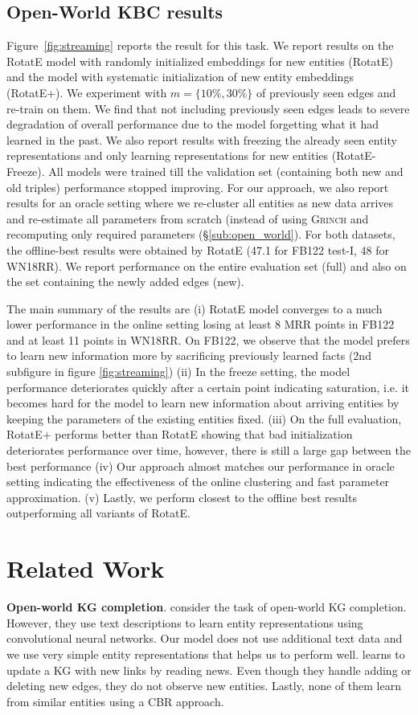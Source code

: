 \documentclass[11pt,a4paper]{article}
\newcommand{\fb}{FB122\xspace}
\newcommand{\wn}{WN18RR\xspace}
\newcommand{\grinch}{\textsc{Grinch}\xspace}
\begin{document}
\subsection{Open-World KBC results}
\label{sub:online}
Figure~\ref{fig:streaming} reports the result for this task. We report results on the RotatE model with randomly initialized embeddings for new entities (RotatE) and the model with systematic initialization of new entity embeddings (RotatE+). We experiment with  $m = \{10\%, 30\%\}$ of previously seen edges and re-train on them. We find that not including previously seen edges leads to severe degradation of overall performance due to the model forgetting what it had learned in the past. We also report results with freezing the already seen entity representations and only learning representations for new entities (RotatE-Freeze). All models were trained till the validation set (containing both new and old triples) performance stopped improving. For our approach, we also report results for an oracle setting where we re-cluster all entities as new data arrives and re-estimate all parameters from scratch (instead of using \grinch and recomputing only required parameters (\S\ref{sub:open_world}). For both datasets, the offline-best results were obtained by RotatE (47.1 for \fb test-I, 48 for \wn). We report performance on the entire evaluation set (full) and also on the set containing the newly added edges (new).

The main summary of the results are (i) RotatE model converges to a much lower performance in the online setting losing at least 8 MRR points in \fb and at least 11 points in \wn. On \fb, we observe that the model prefers to learn new information more by sacrificing previously learned facts (2nd subfigure in figure \ref{fig:streaming}) (ii) In the freeze setting, the model performance deteriorates quickly after a certain point indicating saturation, i.e. it becomes hard for the model to learn new information about arriving entities by keeping the parameters of the existing entities fixed. (iii) On the full evaluation, RotatE+ performs better than RotatE showing that bad initialization deteriorates performance over time, however, there is still a large gap between the best performance (iv) Our approach almost matches our performance in oracle setting indicating the effectiveness of the online clustering and fast parameter approximation. (v) Lastly, we perform closest to the offline best results outperforming all variants of RotatE. \section{Related Work}
\label{sec:related_work}
\noindent\textbf{Open-world KG completion}. \citet{shi2018open} consider the task of open-world KG completion. However, they use text descriptions to learn entity representations using convolutional neural networks. Our model does not use additional text data and we use very simple entity representations that helps us to perform well. \citet{tang2019learning} learns to update a KG with new links by reading news. Even though they handle adding or deleting new edges, they do not observe new entities. Lastly, none of them learn from similar entities using a CBR approach.
\end{document}
